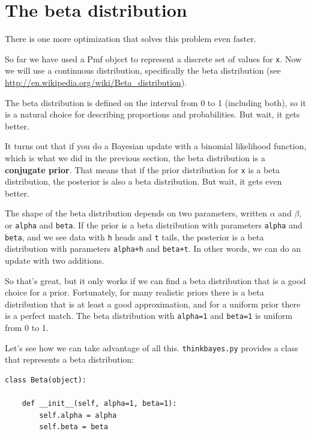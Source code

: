 \documentclass[12pt]{book}
\begin{document}
\section{The beta distribution}
\label{beta}

There is one more optimization that solves this problem
even faster.

So far we have used a Pmf object to represent a discrete set of
values for {\tt x}.  Now we will use a continuous
distribution, specifically the beta distribution (see
\url{http://en.wikipedia.org/wiki/Beta_distribution}).

The beta distribution is defined on the interval from 0 to 1
(including both), so it is a natural choice for describing
proportions and probabilities.  But wait, it gets better.


It turns out that if you do a Bayesian update with a binomial
likelihood function, which is what we did in the previous section, the beta
distribution is a {\bf conjugate prior}.  That means that if the prior
distribution for {\tt x} is a beta distribution, the posterior is also
a beta distribution.  But wait, it gets even better.

The shape of the beta distribution depends on two parameters, written
$\alpha$ and $\beta$, or {\tt alpha} and {\tt beta}.  If the prior
is a beta distribution with parameters {\tt alpha} and {\tt beta}, and
we see data with {\tt h} heads and {\tt t} tails, the posterior is a
beta distribution with parameters {\tt alpha+h} and {\tt beta+t}.  In
other words, we can do an update with two additions.

So that's great, but it only works if we can find a beta distribution
that is a good choice for a prior.  Fortunately, for many realistic
priors there is a beta distribution that is at least a good
approximation, and for a uniform prior there is a perfect match.  The
beta distribution with {\tt alpha=1} and {\tt beta=1} is uniform from
0 to 1.

Let's see how we can take advantage of all this.  
{\tt thinkbayes.py} provides 
a class that represents a beta distribution:

\begin{verbatim}
class Beta(object):

    def __init__(self, alpha=1, beta=1):
        self.alpha = alpha
        self.beta = beta
\end{verbatim}
\end{document}
